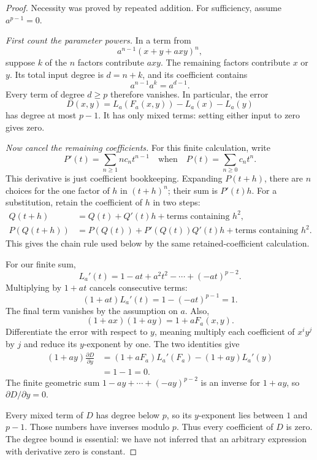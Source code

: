 \begin{proof}
Necessity was proved by repeated addition. For sufficiency, assume \(a^{p-1}=0\).

\emph{First count the parameter powers.} In a term from
\[
 a^{n-1}(x+y+a xy)^n,
\]
suppose \(k\) of the \(n\) factors contribute \(a xy\). The remaining factors contribute \(x\) or \(y\). Its total input degree is \(d=n+k\), and its coefficient contains
\[
 a^{n-1}a^k=a^{d-1}.
\]
Every term of degree \(d\ge p\) therefore vanishes. In particular, the error
\[
 D(x,y)=L_a(F_a(x,y))-L_a(x)-L_a(y)
\]
has degree at most \(p-1\). It has only mixed terms: setting either input to zero gives zero.

\emph{Now cancel the remaining coefficients.} For this finite calculation, write
\[
 P'(t)=\sum_{n\ge1}n c_nt^{n-1}
 \quad\text{when}\quad P(t)=\sum_{n\ge0}c_nt^n.
\]
This derivative is just coefficient bookkeeping. Expanding \(P(t+h)\), there are \(n\) choices for the one factor of \(h\) in \((t+h)^n\); their sum is \(P'(t)h\). For a substitution, retain the coefficient of \(h\) in two steps:
\begin{align*}
 Q(t+h)&=Q(t)+Q'(t)h+\text{terms containing }h^2,\\
 P(Q(t+h))&=P(Q(t))+P'(Q(t))Q'(t)h
 +\text{terms containing }h^2.
\end{align*}
This gives the chain rule used below by the same retained-coefficient calculation.

For our finite sum,
\[
 L_a'(t)=1-at+a^2t^2-\cdots+(-at)^{p-2}.
\]
Multiplying by \(1+at\) cancels consecutive terms:
\begin{equation}\label{eq:finite-geometric}
 (1+at)L_a'(t)=1-(-at)^{p-1}=1.
\end{equation}
The final term vanishes by the assumption on \(a\). Also,
\[
 (1+ax)(1+ay)=1+aF_a(x,y).
\]
Differentiate the error with respect to \(y\), meaning multiply each coefficient of \(x^iy^j\) by \(j\) and reduce its \(y\)-exponent by one. The two identities give
\begin{align*}
 (1+ay)\frac{\partial D}{\partial y}
 &=(1+aF_a)L_a'(F_a)-(1+ay)L_a'(y)\\
 &=1-1=0.
\end{align*}
The finite geometric sum \(1-ay+\cdots+(-ay)^{p-2}\) is an inverse for \(1+ay\), so \(\partial D/\partial y=0\).

Every mixed term of \(D\) has degree below \(p\), so its \(y\)-exponent lies between \(1\) and \(p-1\). Those numbers have inverses modulo \(p\). Thus every coefficient of \(D\) is zero. The degree bound is essential: we have not inferred that an arbitrary expression with derivative zero is constant.


\end{proof}
